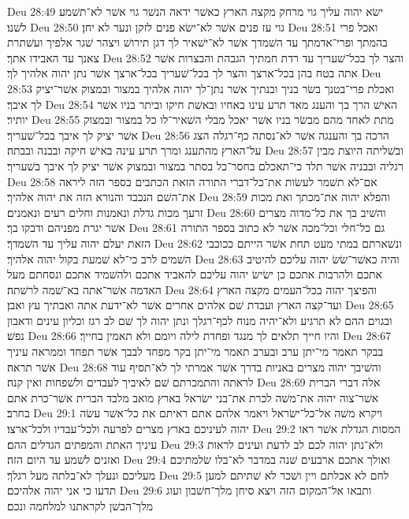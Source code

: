 Deu 28:49  ישׂא יהוה עליך גוי מרחק מקצה הארץ כאשׁר ידאה הנשׁר גוי אשׁר לא־תשׁמע לשׁנו׃
Deu 28:50  גוי עז פנים אשׁר לא־ישׂא פנים לזקן ונער לא יחן׃
Deu 28:51  ואכל פרי בהמתך ופרי־אדמתך עד השׁמדך אשׁר לא־ישׁאיר לך דגן תירושׁ ויצהר שׁגר אלפיך ועשׁתרת צאנך עד האבידו אתך׃
Deu 28:52  והצר לך בכל־שׁעריך עד רדת חמתיך הגבהת והבצרות אשׁר אתה בטח בהן בכל־ארצך והצר לך בכל־שׁעריך בכל־ארצך אשׁר נתן יהוה אלהיך לך׃
Deu 28:53  ואכלת פרי־בטנך בשׂר בניך ובנתיך אשׁר נתן־לך יהוה אלהיך במצור ובמצוק אשׁר־יציק לך איבך׃
Deu 28:54  האישׁ הרך בך והענג מאד תרע עינו באחיו ובאשׁת חיקו וביתר בניו אשׁר יותיר׃
Deu 28:55  מתת לאחד מהם מבשׂר בניו אשׁר יאכל מבלי השׁאיר־לו כל במצור ובמצוק אשׁר יציק לך איבך בכל־שׁעריך׃
Deu 28:56  הרכה בך והענגה אשׁר לא־נסתה כף־רגלה הצג על־הארץ מהתענג ומרך תרע עינה באישׁ חיקה ובבנה ובבתה׃
Deu 28:57  ובשׁליתה היוצת מבין רגליה ובבניה אשׁר תלד כי־תאכלם בחסר־כל בסתר במצור ובמצוק אשׁר יציק לך איבך בשׁעריך׃
Deu 28:58  אם־לא תשׁמר לעשׂות את־כל־דברי התורה הזאת הכתבים בספר הזה ליראה את־השׁם הנכבד והנורא הזה את יהוה אלהיך׃
Deu 28:59  והפלא יהוה את־מכתך ואת מכות זרעך מכות גדלת ונאמנות וחלים רעים ונאמנים׃
Deu 28:60  והשׁיב בך את כל־מדוה מצרים אשׁר יגרת מפניהם ודבקו בך׃
Deu 28:61  גם כל־חלי וכל־מכה אשׁר לא כתוב בספר התורה הזאת יעלם יהוה עליך עד השׁמדך׃
Deu 28:62  ונשׁארתם במתי מעט תחת אשׁר הייתם ככוכבי השׁמים לרב כי־לא שׁמעת בקול יהוה אלהיך׃
Deu 28:63  והיה כאשׁר־שׂשׂ יהוה עליכם להיטיב אתכם ולהרבות אתכם כן ישׂישׂ יהוה עליכם להאביד אתכם ולהשׁמיד אתכם ונסחתם מעל האדמה אשׁר־אתה בא־שׁמה לרשׁתה׃
Deu 28:64  והפיצך יהוה בכל־העמים מקצה הארץ ועד־קצה הארץ ועבדת שׁם אלהים אחרים אשׁר לא־ידעת אתה ואבתיך עץ ואבן׃
Deu 28:65  ובגוים ההם לא תרגיע ולא־יהיה מנוח לכף־רגלך ונתן יהוה לך שׁם לב רגז וכליון עינים ודאבון נפשׁ׃
Deu 28:66  והיו חייך תלאים לך מנגד ופחדת לילה ויומם ולא תאמין בחייך׃
Deu 28:67  בבקר תאמר מי־יתן ערב ובערב תאמר מי־יתן בקר מפחד לבבך אשׁר תפחד וממראה עיניך אשׁר תראה׃
Deu 28:68  והשׁיבך יהוה מצרים באניות בדרך אשׁר אמרתי לך לא־תסיף עוד לראתה והתמכרתם שׁם לאיביך לעבדים ולשׁפחות ואין קנה׃
Deu 28:69  אלה דברי הברית אשׁר־צוה יהוה את־משׁה לכרת את־בני ישׂראל בארץ מואב מלבד הברית אשׁר־כרת אתם בחרב׃
Deu 29:1  ויקרא משׁה אל־כל־ישׂראל ויאמר אלהם אתם ראיתם את כל־אשׁר עשׂה יהוה לעיניכם בארץ מצרים לפרעה ולכל־עבדיו ולכל־ארצו׃
Deu 29:2  המסות הגדלת אשׁר ראו עיניך האתת והמפתים הגדלים ההם׃
Deu 29:3  ולא־נתן יהוה לכם לב לדעת ועינים לראות ואזנים לשׁמע עד היום הזה׃
Deu 29:4  ואולך אתכם ארבעים שׁנה במדבר לא־בלו שׂלמתיכם מעליכם ונעלך לא־בלתה מעל רגלך׃
Deu 29:5  לחם לא אכלתם ויין ושׁכר לא שׁתיתם למען תדעו כי אני יהוה אלהיכם׃
Deu 29:6  ותבאו אל־המקום הזה ויצא סיחן מלך־חשׁבון ועוג מלך־הבשׁן לקראתנו למלחמה ונכם׃
